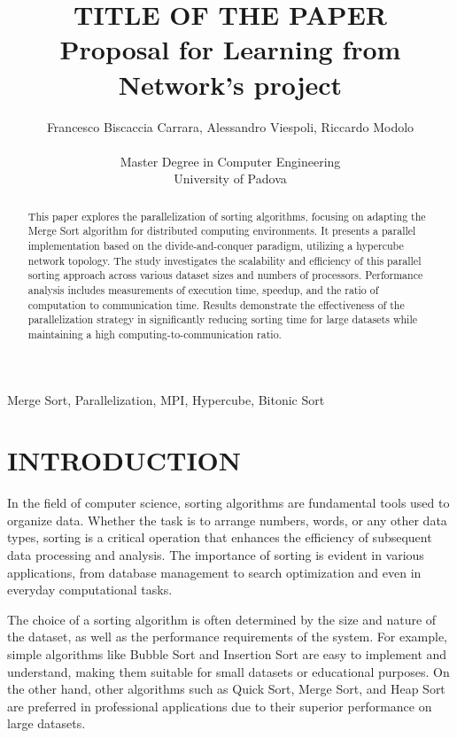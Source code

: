 \documentclass[article,12pt,conference]{ieeeconf} %
\title{\LARGE TITLE OF THE PAPER \\
\large Proposal for Learning from Network's project \\}
\author{Francesco Biscaccia Carrara, Alessandro Viespoli, Riccardo Modolo %
\\\\ Master Degree in Computer Engineering \\
University of Padova \\
}
\begin{document}
\maketitle
\thispagestyle{plain}
\pagestyle{plain}

\begin{abstract}
This paper explores the parallelization of sorting algorithms, focusing on adapting the Merge Sort algorithm for distributed computing environments. It presents a parallel implementation based on the divide-and-conquer paradigm, utilizing a hypercube network topology. The study investigates the scalability and efficiency of this parallel sorting approach across various dataset sizes and numbers of processors. Performance analysis includes measurements of execution time, speedup, and the ratio of computation to communication time. Results demonstrate the effectiveness of the parallelization strategy in significantly reducing sorting time for large datasets while maintaining a high computing-to-communication ratio. 
\end{abstract}

\begin{keywords}
Merge Sort, Parallelization, MPI, Hypercube, Bitonic Sort
\end{keywords}

\section{INTRODUCTION}

In the field of computer science, sorting algorithms are fundamental tools used to organize data. Whether the task is to arrange numbers, words, or any other data types, sorting is a critical operation that enhances the efficiency of subsequent data processing and analysis. The importance of sorting is evident in various applications, from database management to search optimization and even in everyday computational tasks.\par

The choice of a sorting algorithm is often determined by the size and nature of the dataset, as well as the performance requirements of the system. For example, simple algorithms like Bubble Sort and Insertion Sort are easy to implement and understand, making them suitable for small datasets or educational purposes. On the other hand, other algorithms such as Quick Sort, Merge Sort, and Heap Sort are preferred in professional applications due to their superior performance on large datasets.\par
\end{document}
